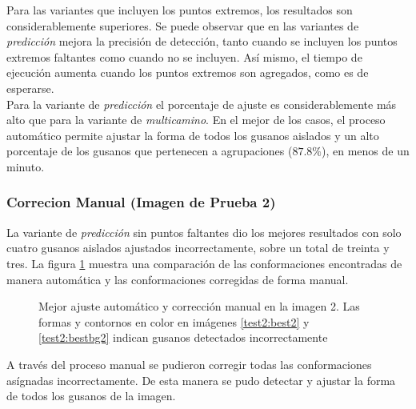 Para las variantes que incluyen los puntos extremos, los resultados son
considerablemente superiores. Se puede observar que en las variantes de 
\emph{predicci\'on} mejora la precisi\'on de detecci\'on, tanto cuando
se incluyen los puntos extremos faltantes como cuando no se incluyen. As\'i
mismo, el tiempo de ejecuci\'on aumenta cuando los puntos extremos son
agregados, como es de esperarse.\\
Para la variante de \emph{predicci\'on} el porcentaje de ajuste es
considerablemente m\'as alto que para la variante de \emph{multicamino}.
En el mejor de los casos, el proceso autom\'atico permite ajustar
la forma de todos los gusanos aislados y un alto porcentaje de los
gusanos que pertenecen a agrupaciones ($87.8\%$), en menos de un minuto.

\subsubsection*{Correcion Manual (Imagen de Prueba 2)}

La variante de \emph{predicci\'on} sin puntos faltantes dio los mejores
resultados con solo cuatro gusanos aislados ajustados incorrectamente, sobre
un total de treinta y tres. La figura \ref{fig:best2} muestra una comparaci\'on de 
las conformaciones encontradas de manera autom\'atica y 
las conformaciones corregidas de forma manual.

\begin{figure}[h]
  \centering
\qquad
\qquad
\qquad

\caption[Mejor ajuste autom\'atico y correcci\'on manual en la imagen 2]{Mejor ajuste autom\'atico y correcci\'on manual en la imagen 2.
Las formas y contornos en color en im\'agenes \ref{test2:best2} y \ref{test2:bestbg2} indican gusanos detectados incorrectamente} 
\label{fig:best2}
\end{figure}

A trav\'es del proceso manual se pudieron corregir todas las conformaciones as\'ignadas incorrectamente.
De esta manera se pudo detectar y ajustar la forma de todos los gusanos de la imagen.

